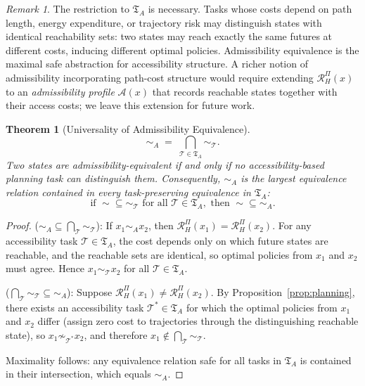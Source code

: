 \documentclass[11pt, a4paper]{article}
\theoremstyle{plain}
\newtheorem{theorem}{Theorem}
\theoremstyle{definition}
\theoremstyle{remark}
\newtheorem{remark}{Remark}
\newcommand{\simA}{\sim_A}
\newcommand{\RHP}{\mathcal{R}_H^\Pi}
\begin{document}
\begin{remark}
The restriction to $\mathfrak{T}_A$ is necessary. Tasks whose costs depend on
path length, energy expenditure, or trajectory risk may distinguish states with
identical reachability sets: two states may reach exactly the same futures at
different costs, inducing different optimal policies. Admissibility equivalence
is the maximal safe abstraction for accessibility structure. A richer notion of
admissibility incorporating path-cost structure would require extending
$\RHP(x)$ to an \emph{admissibility profile} $\mathcal{A}(x)$ that records
reachable states together with their access costs; we leave this extension for
future work.
\end{remark}

\begin{theorem}[Universality of Admissibility Equivalence]
\label{thm:universality}
\begin{equation}
  \simA \;=\; \bigcap_{\mathcal{T} \in \mathfrak{T}_A} \sim_{\mathcal{T}}.
\end{equation}
Two states are admissibility-equivalent if and only if no accessibility-based
planning task can distinguish them. Consequently, $\simA$ is the largest
equivalence relation contained in every task-preserving equivalence in
$\mathfrak{T}_A$:
\begin{equation}
  \text{if } {\sim} \subseteq {\sim_{\mathcal{T}}} \text{ for all }
  \mathcal{T} \in \mathfrak{T}_A,\text{ then } {\sim} \subseteq {\simA}.
\end{equation}
\end{theorem}

\begin{proof}
($\simA \subseteq \bigcap_{\mathcal{T}} \sim_{\mathcal{T}}$): If $x_1 \simA
x_2$, then $\RHP(x_1) = \RHP(x_2)$. For any accessibility task
$\mathcal{T} \in \mathfrak{T}_A$, the cost depends only on which future states
are reachable, and the reachable sets are identical, so optimal policies from
$x_1$ and $x_2$ must agree. Hence $x_1 \sim_{\mathcal{T}} x_2$ for all
$\mathcal{T} \in \mathfrak{T}_A$.

($\bigcap_{\mathcal{T}} \sim_{\mathcal{T}} \subseteq \simA$): Suppose
$\RHP(x_1) \neq \RHP(x_2)$. By Proposition~\ref{prop:planning}, there exists
an accessibility task $\mathcal{T}^* \in \mathfrak{T}_A$ for which the optimal
policies from $x_1$ and $x_2$ differ (assign zero cost to trajectories through
the distinguishing reachable state), so $x_1 \not\sim_{\mathcal{T}^*} x_2$,
and therefore $x_1 \notin \bigcap_{\mathcal{T}} \sim_{\mathcal{T}}$.

Maximality follows: any equivalence relation safe for all tasks in
$\mathfrak{T}_A$ is contained in their intersection, which equals $\simA$.
\end{proof}
\end{document}
